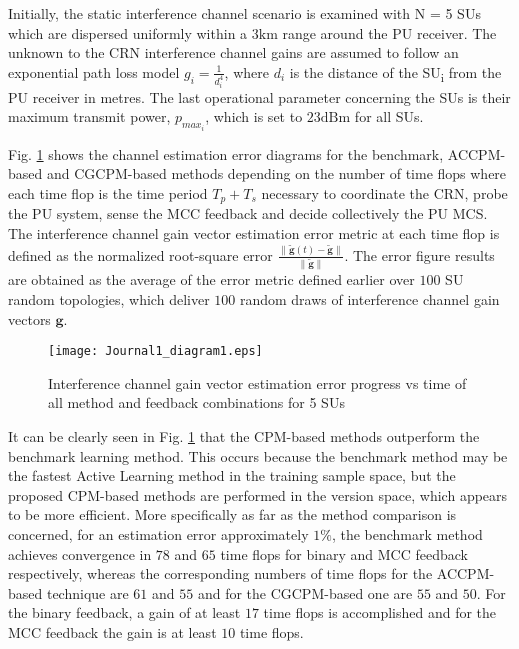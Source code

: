 \documentclass[journal]{IEEEtran}
\begin{document}
Initially, the static interference channel scenario is examined with N = 5 SUs which are dispersed uniformly within a $3\mbox{km}$ range around the PU receiver. The unknown to the CRN interference channel gains are assumed to follow an exponential path loss model $g_{i}=\frac{1}{d_{i}^{4}}$, where $d_{i}$ is the distance of the SU\textsubscript{i} from the PU receiver in metres. The last operational parameter concerning the SUs is their maximum transmit power, $p_{max_{i}}$, which is set to $23\mbox{dBm}$ for all SUs.

Fig. \ref{fig3} shows the channel estimation error diagrams for the benchmark, ACCPM-based and CGCPM-based methods depending on the number of time flops where each time flop is the time period $T_{p}+T_{s}$ necessary to coordinate the CRN, probe the PU system, sense the MCC feedback and decide collectively the PU MCS. The interference channel gain vector estimation error metric at each time flop is defined as the normalized root-square error $\frac{\lVert \mathbf{\tilde{g}}(t)-\mathbf{\tilde{g}} \rVert}{\lVert \mathbf{\tilde{g}} \rVert}$. The error figure results are obtained as the average of the error metric defined earlier over $100$ SU random topologies, which deliver $100$ random draws of interference channel gain vectors $\mathbf{g}$. 

\begin{figure}[!h]
\centering
\texttt{[image: Journal1\_diagram1.eps]}
\caption{Interference channel gain vector estimation error progress vs time of all method and feedback combinations for 5 SUs}
\label{fig3}
\end{figure}
It can be clearly seen in Fig. \ref{fig3} that the CPM-based methods outperform the benchmark learning method. This occurs because the benchmark method may be the fastest Active Learning method in the training sample space, but the proposed CPM-based methods are performed in the version space, which appears to be more efficient. More specifically as far as the method comparison is concerned, for an estimation error approximately $1\%$, the benchmark method achieves convergence in $78$ and $65$ time flops for binary and MCC feedback respectively, whereas the corresponding numbers of time flops for the ACCPM-based technique are $61$ and $55$ and for the CGCPM-based one are $55$ and $50$. For the binary feedback, a gain of at least $17$ time flops is accomplished and for the MCC feedback the gain is at least $10$ time flops.  
\end{document}

